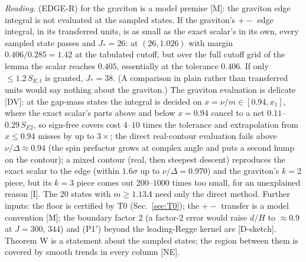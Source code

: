 \documentclass[aps,prl,onecolumn,superscriptaddress,nofootinbib]{revtex4-2}
\begin{document}
\emph{Reading.} (EDGE-R) for the graviton is a model premise [M]: the graviton edge integral is not evaluated at the sampled states. If the graviton's $+-$ edge integral, in its transferred units, is as small as the exact scalar's in its own,
every sampled state passes and $J_*=26$: at $(26,1.026)$ with margin $0.406/0.285=1.42$ at the tabulated cutoff, but over the full
cutoff grid of the lemma the scalar reaches $0.405$, essentially at the tolerance $0.406$. If only $\le1.2\,S_{E,t}$ is granted,
$J_*=38$. (A comparison in plain rather than transferred units would say nothing about the graviton.) The graviton evaluation is delicate [DV]: at the gap-mass states the integral is decided on
$x=\nu/m\in[0.94,x_1]$, where the exact scalar's parts above and below $x=0.94$ cancel to a net $0.11$--$0.29\,S_{E2}$, so sign-free
covers cost $4$--$10$ times the tolerance and extrapolation from $x\le0.94$ misses by up to $3\times$; the direct real-contour evaluation
fails above $\nu/\Delta\approx0.94$ (the spin prefactor grows at complex angle and puts a second hump on the contour); a mixed contour (real, then
steepest descent) reproduces the exact scalar to the edge (within $1.6\sigma$ up to $\nu/\Delta=0.970$) and the graviton's $k=2$ piece, but its
$k=3$ piece comes out $200$--$1000$ times too small, for an unexplained reason [I]. The 20 states with $m\ge1.13\Lambda$ need only the
direct method. Further inputs: the floor is certified by T0 (Sec.~\ref{sec:T0}); the $+-$ transfer is a model convention [M]; the boundary factor $2$ (a factor-2 error would raise $d/H$ to
$\approx0.9$ at $J=300$, $344$) and (P1$'$) beyond the leading-Regge kernel are [D-sketch]. Theorem W is a statement about the sampled states; the region between them is covered by
smooth trends in every column [NE].
\end{document}
